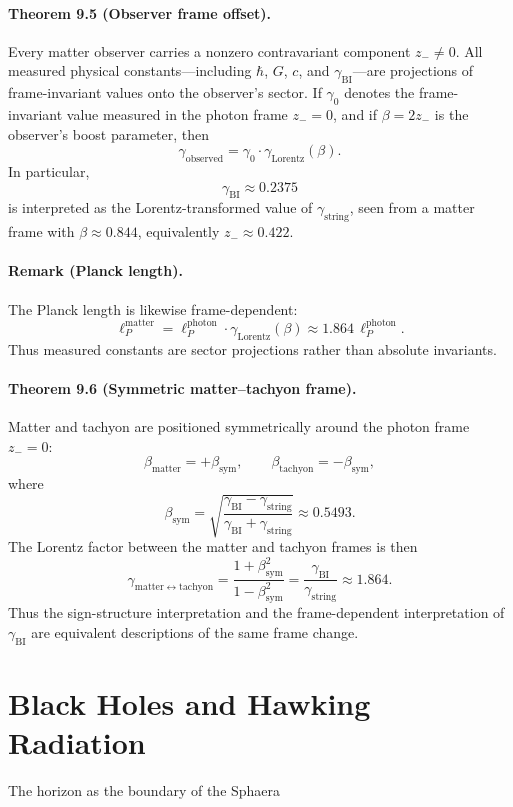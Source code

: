 \documentclass[12pt,a4paper]{article}
\begin{document}
\paragraph*{Theorem 9.5 (Observer frame offset).}
Every matter observer carries a nonzero contravariant component $z_- \neq 0$. All measured physical constants---including $\hbar$, $G$, $c$, and $\gamma_{\mathrm{BI}}$---are projections of frame-invariant values onto the observer's sector. If $\gamma_0$ denotes the frame-invariant value measured in the photon frame $z_-=0$, and if $\beta=2z_-$ is the observer's boost parameter, then
\[
\gamma_{\mathrm{observed}} = \gamma_0 \cdot \gamma_{\mathrm{Lorentz}}(\beta).
\]
In particular,
\[
\gamma_{\mathrm{BI}} \approx 0.2375
\]
is interpreted as the Lorentz-transformed value of $\gamma_{\mathrm{string}}$, seen from a matter frame with $\beta \approx 0.844$, equivalently $z_- \approx 0.422$.

\paragraph*{Remark (Planck length).}
The Planck length is likewise frame-dependent:
\[
\ell_P^{\mathrm{matter}} = \ell_P^{\mathrm{photon}} \cdot \gamma_{\mathrm{Lorentz}}(\beta) \approx 1.864\, \ell_P^{\mathrm{photon}}.
\]
Thus measured constants are sector projections rather than absolute invariants.

\paragraph*{Theorem 9.6 (Symmetric matter--tachyon frame).}
Matter and tachyon are positioned symmetrically around the photon frame $z_-=0$:
\[
\beta_{\mathrm{matter}} = +\beta_{\mathrm{sym}}, \qquad \beta_{\mathrm{tachyon}} = -\beta_{\mathrm{sym}},
\]
where
\[
\beta_{\mathrm{sym}} = \sqrt{\frac{\gamma_{\mathrm{BI}}-\gamma_{\mathrm{string}}}{\gamma_{\mathrm{BI}}+\gamma_{\mathrm{string}}}} \approx 0.5493.
\]
The Lorentz factor between the matter and tachyon frames is then
\[
\gamma_{\mathrm{matter}\leftrightarrow\mathrm{tachyon}} = \frac{1+\beta_{\mathrm{sym}}^2}{1-\beta_{\mathrm{sym}}^2} = \frac{\gamma_{\mathrm{BI}}}{\gamma_{\mathrm{string}}} \approx 1.864.
\]
Thus the sign-structure interpretation and the frame-dependent interpretation of $\gamma_{\mathrm{BI}}$ are equivalent descriptions of the same frame change.


\section{Black Holes and Hawking Radiation}
The horizon as the boundary of the Sphaera
\end{document}
